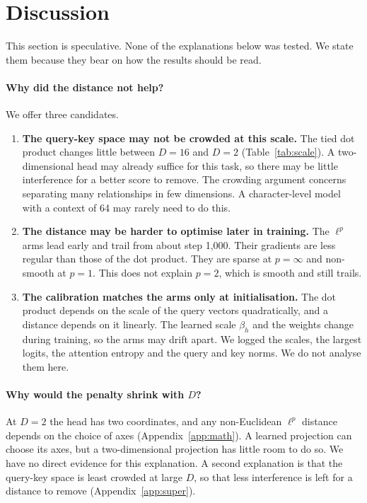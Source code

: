 \documentclass[11pt]{article}
\begin{document}
\section{Discussion}\label{sec:discussion}

This section is speculative.
None of the explanations below was tested.
We state them because they bear on how the results should be read.

\paragraph{Why did the distance not help?}
We offer three candidates.
\begin{enumerate}
\item \textbf{The query-key space may not be crowded at this scale.} The tied dot product changes little between $D=16$ and $D=2$ (Table~\ref{tab:scale}). A two-dimensional head may already suffice for this task, so there may be little interference for a better score to remove. The crowding argument concerns separating many relationships in few dimensions. A character-level model with a context of 64 may rarely need to do this.
\item \textbf{The distance may be harder to optimise later in training.} The $\ell^p$ arms lead early and trail from about step 1,000. Their gradients are less regular than those of the dot product. They are sparse at $p=\infty$ and non-smooth at $p=1$. This does not explain $p=2$, which is smooth and still trails.
\item \textbf{The calibration matches the arms only at initialisation.} The dot product depends on the scale of the query vectors quadratically, and a distance depends on it linearly. The learned scale $\beta_h$ and the weights change during training, so the arms may drift apart. We logged the scales, the largest logits, the attention entropy and the query and key norms. We do not analyse them here.
\end{enumerate}

\paragraph{Why would the penalty shrink with $D$?}
At $D=2$ the head has two coordinates, and any non-Euclidean $\ell^p$ distance depends on the choice of axes (Appendix~\ref{app:math}).
A learned projection can choose its axes, but a two-dimensional projection has little room to do so.
We have no direct evidence for this explanation.
A second explanation is that the query-key space is least crowded at large $D$, so that less interference is left for a distance to remove (Appendix~\ref{app:super}).
\end{document}
